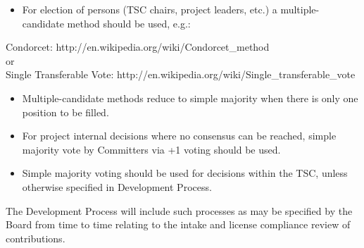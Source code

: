 \documentclass[a4paper, 12pt]{book}
\begin{document}
{\begin{itemize}\itemsep0pt
\item{For election of persons (TSC chairs, project leaders, etc.) a multiple-candidate method should be used, e.g.:}
\end{itemize}
Condorcet: http://en.wikipedia.org/wiki/Condorcet\_method
\\
or\\
Single Transferable Vote: http://en.wikipedia.org/wiki/Single\_transferable\_vote
\begin{itemize}\itemsep0pt
\item{Multiple-candidate methods reduce to simple majority when there is only one position to be filled.}
\item{For project internal decisions where no consensus can be reached, simple majority vote by Committers via +1 voting should be used}.
\item{Simple majority voting should be used for decisions within the TSC, unless otherwise specified in Development Process}.
\end{itemize}
The Development Process will include such processes as may be specified by the Board from time to time relating to the intake and license compliance review of contributions.

}
\end{document}
